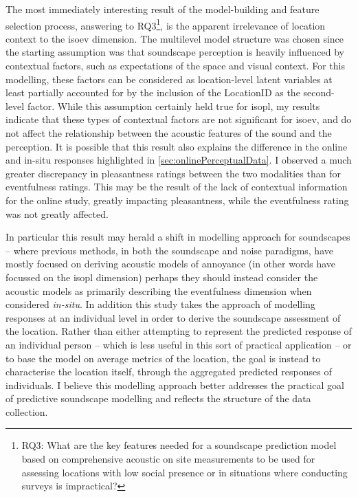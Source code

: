    The most immediately interesting result of the model-building and feature selection process, answering to RQ3\footnote{RQ3: What are the key features needed for a soundscape prediction model based on comprehensive acoustic on site measurements to be used for assessing locations with low social presence or in situations where conducting surveys is impractical?}, is the apparent irrelevance of location context to the \gls{isoev} dimension. The multilevel model structure was chosen since the starting assumption was that soundscape perception is heavily influenced by contextual factors, such as expectations of the space and visual context. For this modelling, these factors can be considered as location-level latent variables at least partially accounted for by the inclusion of the LocationID as the second-level factor. While this assumption certainly held true for \gls{isopl}, my results indicate that these types of contextual factors are not significant for \gls{isoev}, and do not affect the relationship between the acoustic features of the sound and the perception. It is possible that this result also explains the difference in the online and in-situ responses highlighted in \cref{sec:onlinePerceptualData}. I observed a much greater discrepancy in pleasantness ratings between the two modalities than for eventfulness ratings. This may be the result of the lack of contextual information for the online study, greatly impacting pleasantness, while the eventfulness rating was not greatly affected.

   In particular this result may herald a shift in modelling approach for soundscapes -- where previous methods, in both the soundscape and noise paradigms, have mostly focused on deriving acoustic models of annoyance (in other words have focussed on the \gls{isopl} dimension) perhaps they should instead consider the acoustic models as primarily describing the eventfulness dimension when considered \emph{in-situ}. In addition this study takes the approach of modelling responses at an individual level in order to derive the soundscape assessment of the location. Rather than either attempting to represent the predicted response of an individual person -- which is less useful in this sort of practical application -- or to base the model on average metrics of the location, the goal is instead to characterise the location itself, through the aggregated predicted responses of individuals. I believe this modelling approach better addresses the practical goal of predictive soundscape modelling and reflects the structure of the data collection.

